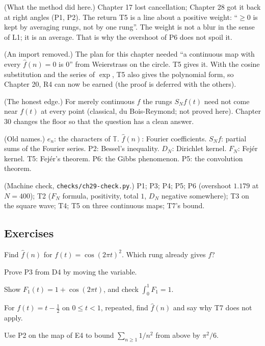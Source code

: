 \begin{lines}
\item[\lab{R1}] (What the method did here.) Chapter 17 lost cancellation; Chapter 28 got it back at right angles (P1, P2). The return T5 is a line about a positive weight: ``$\ge 0$ is kept by averaging rungs, not by one rung''. The weight is not a blur in the sense of L1; it is an average. That is why the overshoot of P6 does not spoil it.
\item[\lab{R2}] (An import removed.) The plan for this chapter needed ``a continuous map with every $\widehat f(n) = 0$ is $0$'' from Weierstrass on the circle. T5 gives it. With the cosine substitution and the series of $\exp$, T5 also gives the polynomial form, so Chapter 20, R4 can now be earned (the proof is deferred with the others).
\item[\lab{R3}] (The honest edge.) For merely continuous $f$ the rungs $S_N f(t)$ need not come near $f(t)$ at every point (classical, du Bois-Reymond; not proved here). Chapter 30 changes the floor so that the question has a clean answer.
\item[\lab{R4}] (Old names.) $e_n$: the characters of $\mathbb{T}$. $\widehat f(n)$: Fourier coefficients. $S_N f$: partial sums of the Fourier series. P2: Bessel's inequality. $D_N$: Dirichlet kernel. $F_N$: Fejér kernel. T5: Fejér's theorem. P6: the Gibbs phenomenon. P5: the convolution theorem.
\item[\lab{R5}] (Machine check, \texttt{checks/ch29-check.py}.) P1; P3; P4; P5; P6 (overshoot $1.179$ at $N = 400$); T2 ($F_N$ formula, positivity, total $1$, $D_N$ negative somewhere); T3 on the square wave; T4; T5 on three continuous maps; T7's bound.
\end{lines}

\subsection*{Exercises}

\begin{lines}
\item[\lab{E1}] Find $\widehat f(n)$ for $f(t) = \cos(2\pi t)^2$. Which rung already gives $f$?
\item[\lab{E2}] Prove P3 from D4 by moving the variable.
\item[\lab{E3}] Show $F_1(t) = 1 + \cos(2\pi t)$, and check $\int_0^1 F_1 = 1$.
\item[\lab{E4}] For $f(t) = t - \tfrac12$ on $0 \le t < 1$, repeated, find $\widehat f(n)$ and say why T7 does not apply.
\item[\lab{E5}] Use P2 on the map of E4 to bound $\sum_{n \ge 1} 1/n^2$ from above by $\pi^2/6$.
\end{lines}

